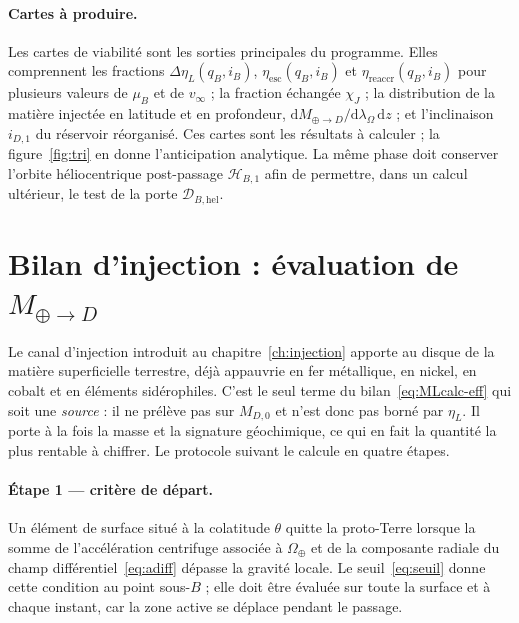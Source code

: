 \documentclass[11pt,a4paper,openany]{report}
\newcommand{\dd}{\mathrm{d}}
\begin{document}
\paragraph{Cartes à produire.}
Les cartes de viabilité sont les sorties principales du programme. Elles comprennent les
fractions $\Delta\eta_L(q_B,i_B)$, $\eta_{\mathrm{esc}}(q_B,i_B)$ et $\eta_{\mathrm{reaccr}}(q_B,i_B)$ pour
plusieurs valeurs de $\mu_B$ et de $v_\infty$ ; la fraction échangée $\chi_J$ ; la distribution
de la matière injectée en latitude et en profondeur, $\dd M_{\oplus\to D}/\dd\lambda_\Omega\,\dd z$ ; et l'inclinaison $i_{D,1}$ du
réservoir réorganisé. Ces cartes sont les résultats à calculer ; la figure~\ref{fig:tri} en donne
l'anticipation analytique.
La même phase doit conserver l'orbite héliocentrique post-passage $\mathcal{H}_{B,1}$ afin de
permettre, dans un calcul ultérieur, le test de la porte $\mathcal{D}_{B,\mathrm{hel}}$.

\section{Bilan d'injection : évaluation de \texorpdfstring{$M_{\oplus\to D}$}{M_Terre-vers-D}}
\label{sec:bilan-injection}

Le canal d'injection introduit au chapitre~\ref{ch:injection} apporte au disque de la matière
superficielle terrestre, déjà appauvrie en fer métallique, en nickel, en cobalt et en éléments
sidérophiles. C'est le seul terme du bilan~\eqref{eq:MLcalc-eff} qui soit une \emph{source} : il ne
prélève pas sur $M_{D,0}$ et n'est donc pas borné par $\eta_L$. Il porte à la fois la masse et la
signature géochimique, ce qui en fait la quantité la plus rentable à chiffrer. Le protocole suivant
le calcule en quatre étapes.

\paragraph{Étape 1 — critère de départ.} Un élément de surface situé à la colatitude $\theta$ quitte
la proto-Terre lorsque la somme de l'accélération centrifuge associée à $\Omega_\oplus$ et de la
composante radiale du champ différentiel~\eqref{eq:adiff} dépasse la gravité locale. Le seuil~\eqref{eq:seuil} donne cette condition au point sous-$B$ ; elle doit être évaluée sur toute la
surface et à chaque instant, car la zone active se déplace pendant le passage.
\end{document}
